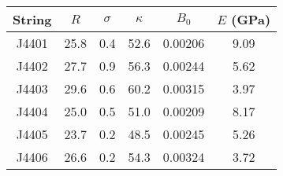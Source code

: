 \begin{tabular}{cccccc}
\toprule
String & $R$ & $\sigma$ & $\kappa$ & $B_0$ & $E$ (GPa) \\
\midrule
J4401 & 25.8 & 0.4 & 52.6 & 0.00206 & 9.09 \\
J4402 & 27.7 & 0.9 & 56.3 & 0.00244 & 5.62 \\
J4403 & 29.6 & 0.6 & 60.2 & 0.00315 & 3.97 \\
J4404 & 25.0 & 0.5 & 51.0 & 0.00209 & 8.17 \\
J4405 & 23.7 & 0.2 & 48.5 & 0.00245 & 5.26 \\
J4406 & 26.6 & 0.2 & 54.3 & 0.00324 & 3.72 \\
\bottomrule
\end{tabular}

